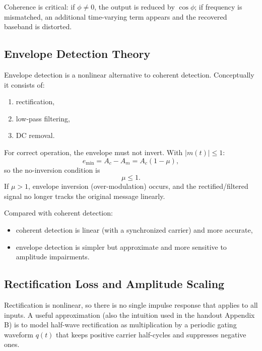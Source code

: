 Coherence is critical: if $\phi\neq 0$, the output is reduced by $\cos\phi$; if frequency is mismatched, an additional time-varying term appears and the recovered baseband is distorted.

\subsection{Envelope Detection Theory}
Envelope detection is a nonlinear alternative to coherent detection. Conceptually it consists of:
\begin{enumerate}
\item rectification,
\item low-pass filtering,
\item DC removal.
\end{enumerate}

For correct operation, the envelope must not invert. With $|m(t)|\le 1$:
\begin{equation}
e_{\min}=A_c-A_m=A_c(1-\mu),
\end{equation}
so the no-inversion condition is
\begin{equation}
\mu \le 1.
\label{eq:no_inversion}
\end{equation}
If $\mu>1$, envelope inversion (over-modulation) occurs, and the rectified/filtered signal no longer tracks the original message linearly.

Compared with coherent detection:
\begin{itemize}
\item coherent detection is linear (with a synchronized carrier) and more accurate,
\item envelope detection is simpler but approximate and more sensitive to amplitude impairments.
\end{itemize}

\subsection{Rectification Loss and Amplitude Scaling}
Rectification is nonlinear, so there is no single impulse response that applies to all inputs. A useful approximation (also the intuition used in the handout Appendix B) is to model half-wave rectification as multiplication by a periodic gating waveform $q(t)$ that keeps positive carrier half-cycles and suppresses negative ones.

